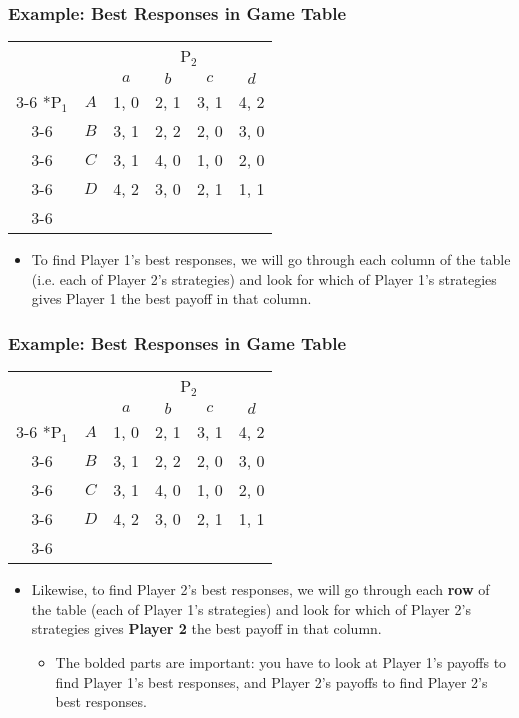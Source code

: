 \begin{frame}
\frametitle{Example: Best Responses in Game Table}
\begin{table}[h]
	\centering
	\begin{tabular}{cc|c|c|c|c|}
		& \multicolumn{1}{c}{} & \multicolumn{4}{c}{P$_2$}\\
		& \multicolumn{1}{c}{} & \multicolumn{1}{c}{$a$} & \multicolumn{1}{c}{$b$} & \multicolumn{1}{c}{$c$} & \multicolumn{1}{c}{$d$} \\\cline{3-6}
		\multirow{4}*{P$_1$}  & $A$ & 1, 0 & 2, 1 & 3, 1 & 4, 2 \\\cline{3-6}
		& $B$ & 3, 1 & 2, 2 & 2, 0 & 3, 0 \\\cline{3-6}
		& $C$ & 3, 1 & 4, 0 & 1, 0 & 2, 0 \\\cline{3-6}
		& $D$ & 4, 2 & 3, 0 & 2, 1 & 1, 1 \\\cline{3-6}
	\end{tabular}
\end{table}
\begin{itemize}
	\item To find Player 1's best responses, we will go through each column of the table (i.e. each of Player 2's strategies) and look for which of Player 1's strategies gives Player 1 the best payoff in that column.
\end{itemize}
\end{frame}

\begin{frame}
\frametitle{Example: Best Responses in Game Table}
\begin{table}[h]
\centering
\begin{tabular}{cc|c|c|c|c|}
	& \multicolumn{1}{c}{} & \multicolumn{4}{c}{P$_2$}\\
	& \multicolumn{1}{c}{} & \multicolumn{1}{c}{$a$} & \multicolumn{1}{c}{$b$} & \multicolumn{1}{c}{$c$} & \multicolumn{1}{c}{$d$} \\\cline{3-6}
	\multirow{4}*{P$_1$}  & $A$ & 1, 0 & 2, 1 & 3, 1 & 4, 2 \\\cline{3-6}
	& $B$ & 3, 1 & 2, 2 & 2, 0 & 3, 0 \\\cline{3-6}
	& $C$ & 3, 1 & 4, 0 & 1, 0 & 2, 0 \\\cline{3-6}
	& $D$ & 4, 2 & 3, 0 & 2, 1 & 1, 1 \\\cline{3-6}
\end{tabular}
\end{table}
\begin{itemize}
	\item Likewise, to find Player 2's best responses, we will go through each \textbf{row} of the table (each of Player 1's strategies) and look for which of Player 2's strategies gives \textbf{Player 2} the best payoff in that column.
	\begin{itemize}
		\item The bolded parts are important: you have to look at Player 1's payoffs to find Player 1's best responses, and Player 2's payoffs to find Player 2's best responses.
	\end{itemize}
\end{itemize}
\end{frame}

